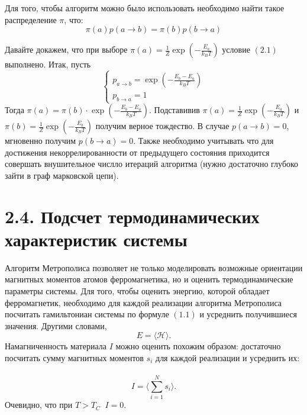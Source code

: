 \documentclass[12pt]{report}
\theoremstyle{definition}
\begin{document}
Для того, чтобы алгоритм можно было использовать необходимо найти такое распределение $\pi$, что:
\begin{equation}\label{eq:equlibrium}
    \pi(a)p(a \rightarrow b) = \pi(b)p(b \rightarrow a)
\end{equation}

Давайте докажем, что при выборе $\pi(a) = \frac{1}{Z} \exp{\left(-\frac{E_a}{k_B T}\right)}$ условие $(2.1)$ выполнено.
Итак, пусть
$$
\left\{\begin{array}{l}{p_{a \rightarrow b}=\exp \left(-\frac{E_{b}-E_{a}}{k_B T}\right)} \\ {p_{b \rightarrow a}=1}\end{array}\right.
$$
Тогда $\pi(a) = \pi(b) \cdot \exp \left(-\frac{E_{b}-E_{a}}{k_B T}\right)$.
Подставивив $\pi(a) = \frac{1}{Z} \exp{\left(-\frac{E_a}{k_B T}\right)}$ и $\pi(b) = \frac{1}{Z} \exp{\left(-\frac{E_b}{k_B T}\right)}$
получим верное тождество. В случае $p(a \rightarrow b) = 0$, мгновенно получим $p(b \rightarrow a) = 0$.
\newline
Также необходимо учитывать что для достижения некоррелированности от предыдущего состояния приходится совершать внушительное числло итераций
алгоритма (нужно достаточно глубоко зайти в граф марковской цепи).

\section{2.4. Подсчет термодинамических характеристик системы}
Алгоритм Метрополиса позволяет не только моделировать возможные ориентации магнитных моментов атомов ферромагнетика, но и оценить термодинамические параметры системы.
Для того, чтобы оценить энергию, которой обладает ферромагнетик, необходимо для каждой реализации алгоритма Метрополиса 
посчитать гамильтониан системы по формуле $(1.1)$ и усреднить получившиеся значения. Другими словами,
\begin{equation}
    E = \langle \mathcal{H} \rangle.
\end{equation}
Намагниченность материала $I$ можно оценить похожим образом: достаточно посчитать сумму магнитных моментов $s_i$ для каждой реализации и усреднить их:
 \begin{equation}
    I = \langle \sum_{i = 1}^N s_i \rangle.
\end{equation}
Очевидно, что при $T > T_C \;\; I = 0$.
\end{document}
